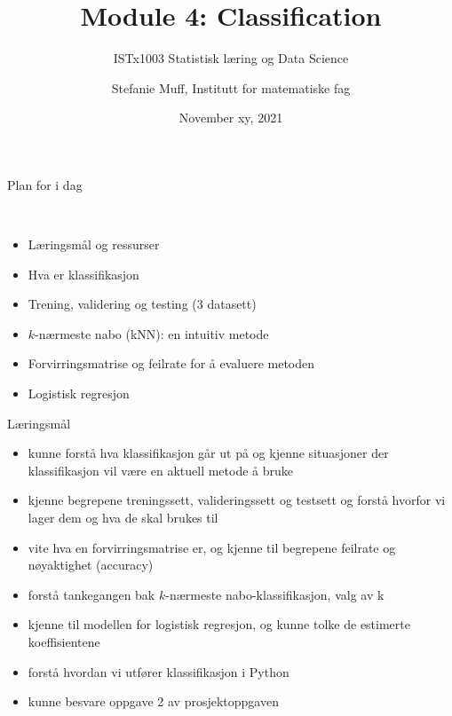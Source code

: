 \documentclass[10pt,ignorenonframetext,]{beamer}
\title{Module 4: Classification}
\subtitle{ISTx1003 Statistisk læring og Data Science}
\author{Stefanie Muff, Institutt for matematiske fag}
\date{November xy, 2021}
\begin{document}
\frame{\titlepage}

\begin{frame}{Plan for i dag}
\protect\hypertarget{plan-for-i-dag}{}

\(~\)

\begin{itemize}
\item
  Læringsmål og ressurser
\item
  Hva er klassifikasjon
\item
  Trening, validering og testing (3 datasett)
\item
  \(k\)-nærmeste nabo (kNN): en intuitiv metode
\item
  Forvirringsmatrise og feilrate for å evaluere metoden
\item
  Logistisk regresjon
\end{itemize}

\end{frame}

\begin{frame}{Læringsmål}
\protect\hypertarget{luxe6ringsmuxe5l}{}

\begin{itemize}
\item
  kunne forstå hva klassifikasjon går ut på og kjenne situasjoner der
  klassifikasjon vil være en aktuell metode å bruke
\item
  kjenne begrepene treningssett, valideringssett og testsett og forstå
  hvorfor vi lager dem og hva de skal brukes til
\item
  vite hva en forvirringsmatrise er, og kjenne til begrepene feilrate og
  nøyaktighet (accuracy)
\item
  forstå tankegangen bak \(k\)-nærmeste nabo-klassifikasjon, valg av k
\item
  kjenne til modellen for logistisk regresjon, og kunne tolke de
  estimerte koeffisientene
\item
  forstå hvordan vi utfører klassifikasjon i Python
\item
  kunne besvare oppgave 2 av prosjektoppgaven
\end{itemize}

\end{frame}
\end{document}
